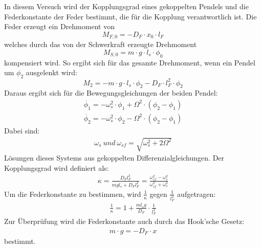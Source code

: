 \documentclass[12pt,a4paper]{article}
\begin{document}
In diesem Versuch wird der Kopplungsgrad eines gekoppelten Pendels und die Federkonstante der Feder bestimmt, die für die Kopplung verantwortlich ist.
Die Feder erzeugt ein Drehmoment von
\begin{equation*}
M_{F,0}=-D_F \cdot x_0 \cdot l_F
\end{equation*}
welches durch das von der Schwerkraft erzeugte Drehmoment 
\begin{equation*}
M_{S,0}=m \cdot g \cdot l_s \cdot \phi_0
\end{equation*}
kompensiert wird.
So ergibt sich für das gesamte Drehmoment, wenn ein Pendel um $\phi_2$ ausgelenkt wird:
\begin{equation*}
M_2=-m \cdot g \cdot l_s \cdot \phi_2 - D_F \cdot l_F^2 \cdot \phi_2
\end{equation*}
Daraus ergibt sich für die Bewegungsgleichungen der beiden Pendel:
\begin{align*}
\ddot{\phi_1}=-\omega_s^2 \cdot \phi_1 + \Omega^2 \cdot (\phi_2 - \phi_1) \\
\ddot{\phi_2}=-\omega_s^2 \cdot \phi_2 - \Omega^2 \cdot (\phi_2 - \phi_1)
\end{align*}
Dabei sind:
\begin{align*}
\omega_s~und~\omega_{sf}=\sqrt{\omega_s^2+2\Omega^2}
\end{align*}
Lösungen dieses Systems aus gekoppelten Differenzialgleichungen.
Der Kopplungsgrad wird definiert als:
\begin{align}
\kappa =\frac{D_F l_F^2}{mgl_s + D_F l_F^2}= \frac{\omega_{sf}^2-\omega_{s}^2}{\omega_{sf}^2+\omega_s^2}
\end{align}
Um die Federkonstante zu bestimmen, wird $\frac{1}{\kappa}$ gegen $\frac{1}{l_F^2}$ aufgetragen:
\begin{align}
\frac{1}{\kappa}=1+\frac{ml_sg}{D_F}\cdot \frac{1}{l_F^2}
\label{k}
\end{align}
Zur Überprüfung wird die Federkonstante auch durch das Hook'sche Gesetz:
\begin{align}
m \cdot g = -D_F \cdot x
\label{Hook}
\end{align}
bestimmt.
\end{document}
